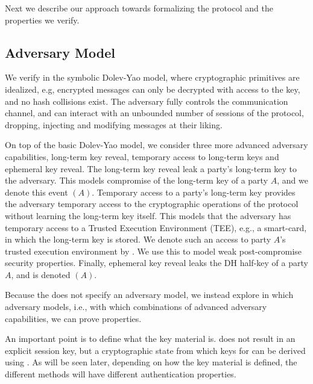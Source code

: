Next we describe our approach towards formalizing the \mEdhoc{} protocol and the
properties we verify.
%

\subsection{Adversary Model}\label{sec:threat-model}
We verify \mEdhoc{} in the symbolic Dolev-Yao model, where
cryptographic primitives are idealized, e.g, encrypted messages can only be
decrypted with access to the key, and no hash collisions exist.
%
The adversary fully controls the
communication channel, and can interact with an unbounded number of sessions
of the protocol, dropping, injecting and modifying messages at their liking.
%

On top of the basic Dolev-Yao model, we consider three more advanced
adversary capabilities, long-term key reveal, temporary access to long-term
keys and ephemeral key reveal.
%
The long-term key reveal leak a party's long-term key to the adversary.
%
This models compromise of the long-term key of a party $A$, and we denote this
event \mRevLTK$(A)$.
%
Temporary access to a party's long-term key provides the adversary temporary
access to the cryptographic operations of the protocol without learning the
long-term key itself.
%
This models that the adversary has temporary access to a Trusted Execution
Environment (TEE), e.g., a smart-card, in which the long-term key is stored.
%
We denote such an access to party $A$'s trusted execution environment by
.
%
We use this to model weak post-compromise security properties.
%
Finally, ephemeral key reveal leaks the DH half-key of a party $A$, and is
denoted \mRevEph$(A)$.
%

Because the \mSpec{} does not specify an adversary model, we instead explore
in which adversary models, i.e., with which combinations of advanced adversary
capabilities, we can prove properties.
%

An important point is to define what the key material is.
    \mEdhoc{} does not result in an explicit session key, but a cryptographic
    state from which keys for \mOscore{} can be derived using \mHkdf.
    As will be seen later, depending on how the key material is defined, the
    different methods will have different authentication properties.

